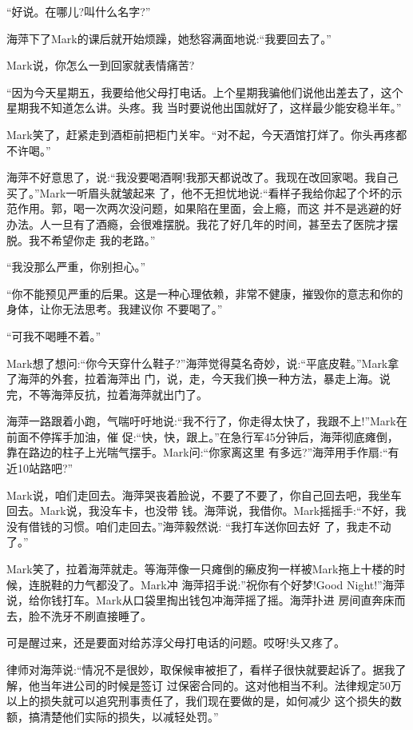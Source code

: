 \documentclass[11pt,a4paper,onecolumn]{article}
\begin{document}
``好说。在哪儿?叫什么名字?''

海萍下了Mark的课后就开始烦躁，她愁容满面地说:``我要回去了。''

Mark说，你怎么一到回家就表情痛苦?

``因为今天星期五，我要给他父母打电话。上个星期我骗他们说他出差去了，这个星期我不知道怎么讲。头疼。我
当时要说他出国就好了，这样最少能安稳半年。''

Mark笑了，赶紧走到酒柜前把柜门关牢。``对不起，今天酒馆打烊了。你头再疼都不许喝。''

海萍不好意思了，说:``我没要喝酒啊!我那天都说改了。我现在改回家喝。我自己买了。''Mark一听眉头就皱起来
了，他不无担忧地说:``看样子我给你起了个坏的示范作用。郭，喝一次两次没问题，如果陷在里面，会上瘾，而这
并不是逃避的好办法。人一旦有了酒瘾，会很难摆脱。我花了好几年的时间，甚至去了医院才摆脱。我不希望你走
我的老路。''

``我没那么严重，你别担心。''

``你不能预见严重的后果。这是一种心理依赖，非常不健康，摧毁你的意志和你的身体，让你无法思考。我建议你
不要喝了。''

``可我不喝睡不着。''

Mark想了想问:``你今天穿什么鞋子?''海萍觉得莫名奇妙，说:``平底皮鞋。''Mark拿了海萍的外套，拉着海萍出
门，说，走，今天我们换一种方法，暴走上海。说完，不等海萍反抗，拉着海萍就出门了。

海萍一路跟着小跑，气喘吁吁地说:``我不行了，你走得太快了，我跟不上!''Mark在前面不停挥手加油，催
促:``快，快，跟上。''在急行军45分钟后，海萍彻底瘫倒，靠在路边的柱子上光喘气摆手。Mark问:``你家离这里
有多远?''海萍用手作扇:``有近10站路吧?''

Mark说，咱们走回去。海萍哭丧着脸说，不要了不要了，你自己回去吧，我坐车回去。Mark说，我没车卡，也没带
钱。海萍说，我借你。Mark摇摇手:``不好，我没有借钱的习惯。咱们走回去。''海萍毅然说: ``我打车送你回去好
了，我走不动了。''

Mark笑了，拉着海萍就走。等海萍像一只瘫倒的癞皮狗一样被Mark拖上十楼的时候，连脱鞋的力气都没了。Mark冲
海萍招手说:''祝你有个好梦!Good Night!''海萍说，给你钱打车。Mark从口袋里掏出钱包冲海萍摇了摇。海萍扑进
房间直奔床而去，脸不洗牙不刷直接睡了。

可是醒过来，还是要面对给苏淳父母打电话的问题。哎呀!头又疼了。

律师对海萍说:``情况不是很妙，取保候审被拒了，看样子很快就要起诉了。据我了解，他当年进公司的时候是签订
过保密合同的。这对他相当不利。法律规定50万以上的损失就可以追究刑事责任了，我们现在要做的是，如何减少
这个损失的数额，搞清楚他们实际的损失，以减轻处罚。''
\end{document}
